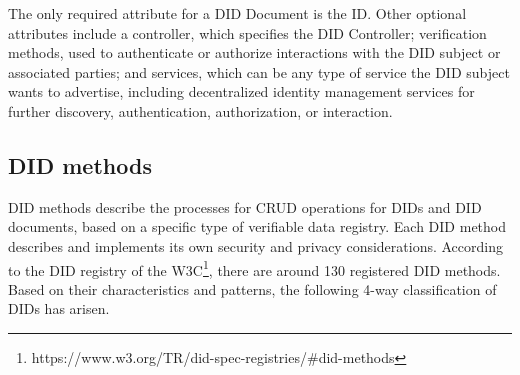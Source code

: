 The only required attribute for a DID Document is the ID. Other optional attributes include a controller, which specifies the DID Controller; verification methods, used to authenticate or authorize interactions with the DID subject or associated parties; and services, which can be any type of service the DID subject wants to advertise, including decentralized identity management services for further discovery, authentication, authorization, or interaction.
 

\subsection{DID methods}

DID methods describe the processes for CRUD operations for DIDs and DID documents, based on a specific type of verifiable data registry. Each DID method describes and implements its own security and privacy considerations. According to the DID registry of the W3C\footnote{https://www.w3.org/TR/did-spec-registries/\#did-methods}, there are around 130 registered DID methods. Based on their characteristics and patterns, the following 4-way classification of DIDs has arisen.

